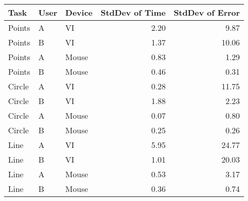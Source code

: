 \begin{tabular}{lllrr}
 \toprule
 Task & User & Device & StdDev of Time & StdDev of Error \\
 \midrule
 Points	& A	& VI	  & 2.20	& 9.87 \\
 Points	& B	& VI	  & 1.37	& 10.06 \\
 Points	& A	& Mouse	& 0.83	& 1.29 \\
 Points	& B	& Mouse	& 0.46	& 0.31 \\
 Circle	& A	& VI	  & 0.28	& 11.75 \\
 Circle	& B	& VI	  & 1.88	& 2.23 \\
 Circle	& A	& Mouse	& 0.07	& 0.80 \\
 Circle	& B	& Mouse	& 0.25	& 0.26 \\
 Line	  & A	& VI	  & 5.95	& 24.77 \\
 Line	  & B	& VI	  & 1.01	& 20.03 \\
 Line	  & A	& Mouse	& 0.53	& 3.17 \\
 Line	  & B	& Mouse	& 0.36	& 0.74 \\
 \bottomrule
\end{tabular}
